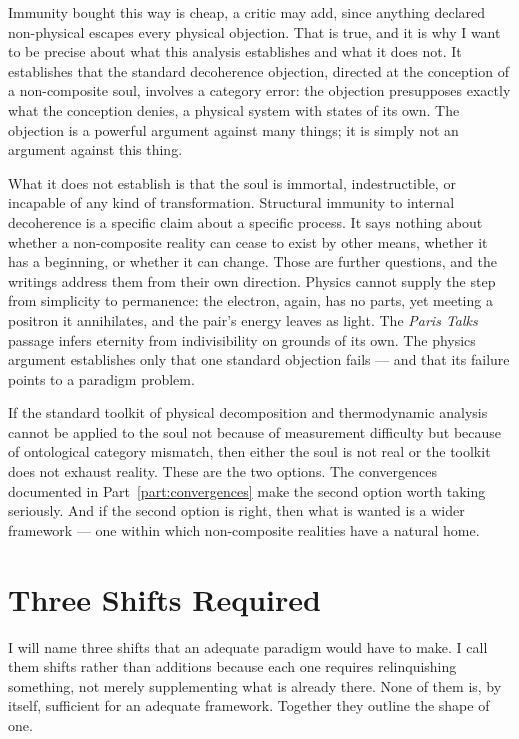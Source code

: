 Immunity bought this way is cheap, a critic may add, since anything declared
non-physical escapes every physical objection. That is true, and it is why I
want to be precise about what this analysis establishes and what it does not.
It establishes that the standard decoherence objection, directed at the \bahai
conception of a non-composite soul, involves a category error: the objection
presupposes exactly what the \bahai conception denies, a physical system with
states of its own. The objection is a powerful argument against many things; it
is simply not an argument against this thing.

What it does not establish is that the soul is immortal, indestructible, or
incapable of any kind of transformation. Structural immunity to internal
decoherence is a specific claim about a specific process. It says nothing about
whether a non-composite reality can cease to exist by other means, whether it
has a beginning, or whether it can change. Those are further questions, and the
\bahai writings address them from their own direction. Physics cannot supply
the step from simplicity to permanence: the electron, again, has no parts, yet
meeting a positron it annihilates, and the pair's energy leaves as light. The
\textit{Paris Talks} passage infers eternity from indivisibility on grounds of
its own. The physics argument
establishes only that one standard objection fails --- and that its failure
points to a paradigm problem.

If the standard toolkit of physical decomposition and thermodynamic analysis
cannot be applied to the soul not because of measurement difficulty but because
of ontological category mismatch, then either the soul is not real or the
toolkit does not exhaust reality. These are the two options. The convergences
documented in Part~\ref{part:convergences} make the second option worth taking
seriously. And if the second option is right, then what is wanted is a wider
framework --- one within which non-composite realities have a natural home.


\section{Three Shifts Required}
\label{sec:three-shifts}

I will name three shifts that an adequate paradigm would have to make. I call
them shifts rather than additions because each one requires relinquishing
something, not merely supplementing what is already there. None of them is, by
itself, sufficient for an adequate framework. Together they outline the shape
of one.



